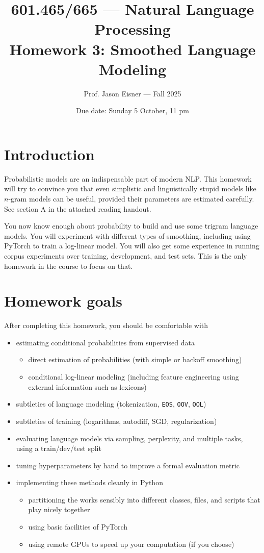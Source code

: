 \documentclass[12pt]{article}
\title{601.465/665 --- Natural Language Processing\\
Homework 3: Smoothed Language Modeling}
\author{Prof. Jason Eisner --- Fall 2025}
\date{Due date: Sunday 5 October, 11 pm}
\theoremstyle{plain}
\theoremstyle{definition}
\theoremstyle{remark}
\begin{document}
\maketitle

\section*{Introduction}
Probabilistic models are an indispensable part of modern NLP. This homework will try to convince you that even simplistic and linguistically stupid models like $n$-gram models can be useful, provided their parameters are estimated carefully. See section A in the attached reading handout.

You now know enough about probability to build and use some trigram language models. You will experiment with different types of smoothing, including using PyTorch to train a log-linear model. You will also get some experience in running corpus experiments over training, development, and test sets. This is the only homework in the course to focus on that.

\section*{Homework goals}
After completing this homework, you should be comfortable with
\begin{itemize}
    \item estimating conditional probabilities from supervised data
    \begin{itemize}
        \item direct estimation of probabilities (with simple or backoff smoothing)
        \item conditional log-linear modeling (including feature engineering using external information such as lexicons)
    \end{itemize}
    \item subtleties of language modeling (tokenization, \texttt{EOS}, \texttt{OOV}, \texttt{OOL})
    \item subtleties of training (logarithms, autodiff, SGD, regularization)
    \item evaluating language models via sampling, perplexity, and multiple tasks, using a train/dev/test split
    \item tuning hyperparameters by hand to improve a formal evaluation metric
    \item implementing these methods cleanly in Python
    \begin{itemize}
        \item partitioning the works sensibly into different classes, files, and scripts that play nicely together
        \item using basic facilities of PyTorch
        \item using remote GPUs to speed up your computation (if you choose)
    \end{itemize}
\end{itemize}
\end{document}
